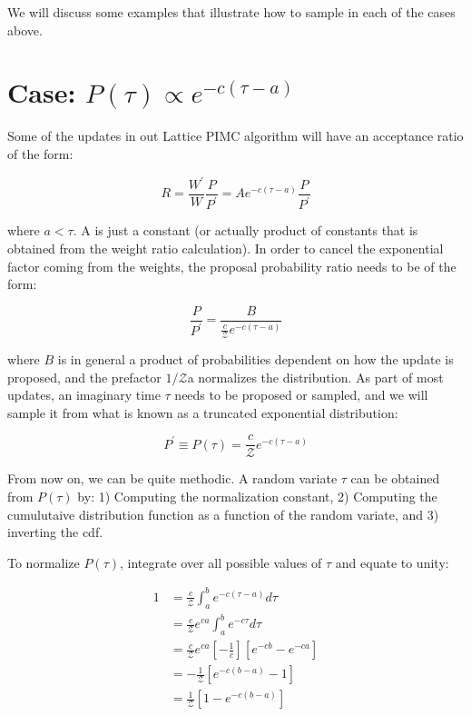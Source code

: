 \documentclass[12pt, two sided]{article}
\begin{document}
We will discuss some examples that illustrate how to sample in each of the cases above. 

\section{Case: $P(\tau) \propto e^{-c(\tau-a)}$}

Some of the updates in out Lattice PIMC algorithm will have an acceptance ratio of the form:

\begin{equation}
R =  \frac{W^\prime}{W} \frac{P}{P^\prime} = Ae^{-c(\tau-a)} \frac{P}{P^\prime}
\end{equation}

where $a<\tau$. A is just a constant (or actually product of constants that is obtained from the weight ratio calculation). In order to cancel the exponential factor coming from the weights, the proposal probability ratio needs to be of the form:

\begin{equation}
\frac{P}{P^\prime} = \frac{B}{\frac{c}{\mathcal{Z}}e^{-c(\tau-a)}}
\end{equation}

where $B$ is in general a product of probabilities dependent on how the update is proposed, and the prefactor $1/\mathcal{Z}$a normalizes the distribution. As part of most updates, an imaginary time $\tau$ needs to be proposed or sampled, and we will sample it from what is known as a truncated exponential distribution:

\begin{equation}
P^\prime \equiv P(\tau) = \frac{c}{\mathcal{Z}}e^{-c(\tau-a)}
\end{equation}

From now on, we can be quite methodic. A random variate $\tau$ can be obtained from $P(\tau)$ by: 1) Computing the normalization constant, 2) Computing the cumulutaive distribution function as a function of the random variate, and 3) inverting the cdf.

To normalize $P(\tau)$, integrate over all possible values of $\tau$ and equate to unity:

\begin{align}
1 &= \frac{c}{\mathcal{Z}} \int_{a}^{b} e^{-c(\tau-a)} d\tau \\
&= \frac{c}{\mathcal{Z}} e^{ca} \int_{a}^{b} e^{-c\tau} d\tau \\
&= \frac{c}{\mathcal{Z}} e^{ca} [-\frac{1}{c}] [e^{-cb}-e^{-ca}] \\
&= -\frac{1}{\mathcal{Z}} [e^{-c(b-a)}-1] \\
&= \frac{1}{\mathcal{Z}} [1-e^{-c(b-a)}] \\
\end{align}
\end{document}
